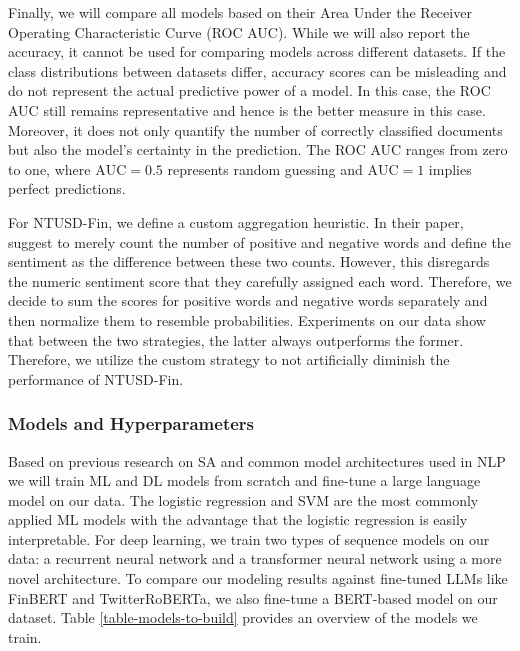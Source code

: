 Finally, we will compare all models based on their Area Under the Receiver Operating Characteristic Curve (ROC AUC). While we will also report the accuracy, it cannot be used for comparing models across different datasets. If the class distributions between datasets differ, accuracy scores can be misleading and do not represent the actual predictive power of a model. In this case, the ROC AUC still remains representative and hence is the better measure in this case. Moreover, it does not only quantify the number of correctly classified documents but also the model's certainty in the prediction. The ROC AUC ranges from zero to one, where $\textrm{AUC}=0.5$ represents random guessing and $\textrm{AUC}=1$ implies perfect predictions.

For NTUSD-Fin, we define a custom aggregation heuristic. In their paper,  suggest to merely count the number of positive and negative words and define the sentiment as the difference between these two counts. However, this disregards the numeric sentiment score that they carefully assigned each word. Therefore, we decide to sum the scores for positive words and negative words separately and then normalize them to resemble probabilities. Experiments on our data show that between the two strategies, the latter always outperforms the former. Therefore, we utilize the custom strategy to not artificially diminish the performance of NTUSD-Fin.

\subsubsection{Models and Hyperparameters}
Based on previous research on SA and common model architectures used in NLP we will train ML and DL models from scratch and fine-tune a large language model on our data. The logistic regression and SVM are the most commonly applied ML models with the advantage that the logistic regression is easily interpretable. For deep learning, we train two types of sequence models on our data: a recurrent neural network and a transformer neural network using a more novel architecture. To compare our modeling results against fine-tuned LLMs like FinBERT and TwitterRoBERTa, we also fine-tune a BERT-based model on our dataset. Table \ref{table-models-to-build} provides an overview of the models we train.



